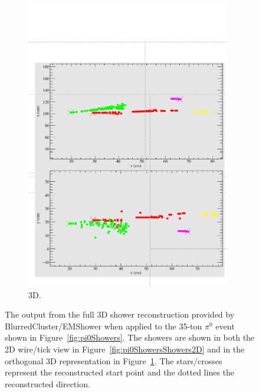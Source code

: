 \begin{figure}
\begin{subfigure}[t]{0.48\linewidth}
    \includegraphics[width=0.98\textwidth]{EVDPi0Shower3D.pdf}
    \caption{3D.}
    \label{fig:pi0ShowersShowers3D}
  \end{subfigure}
  \caption[The output from the full 3D shower reconstruction provided by BlurredCluster/EMShower when applied to the 35-ton $\pi^0$ event shown in Figure~\ref{fig:pi0Showers}.]{The output from the full 3D shower reconstruction provided by BlurredCluster/EMShower when applied to the 35-ton $\pi^0$ event shown in Figure~\ref{fig:pi0Showers}.  The showers are shown in both the 2D wire/tick view in Figure~\ref{fig:pi0ShowersShowers2D} and in the orthogonal 3D representation in Figure~\ref{fig:pi0ShowersShowers3D}.  The stars/crosses represent the reconstructed start point and the dotted lines the reconstructed direction.}
  \label{fig:pi0ShowersShowers}
\end{figure}

